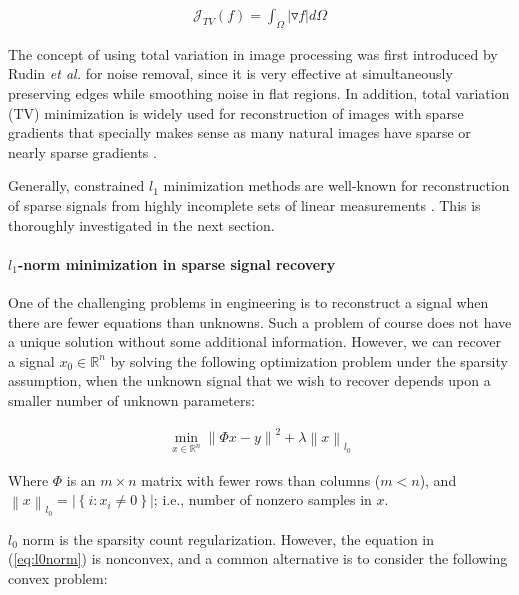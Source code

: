\begin{equation}
\begin{gathered}
\mathcal{J}_{TV}(f) = \int_{\Omega} |\triangledown f| d\Omega
\end{gathered}
\end{equation}

The concept of using total variation in image processing was first introduced by Rudin \emph{et al.} \cite{rudin1992nonlinear} for noise removal, since it is very effective at simultaneously preserving edges while smoothing noise in flat regions. In addition, total variation (TV) minimization is widely used for reconstruction of images with sparse gradients that specially makes sense as many natural images have sparse or nearly sparse gradients \cite{blomgren1998color}.

Generally, constrained $l_{1}$ minimization methods are well-known for reconstruction of sparse signals from highly incomplete sets of linear measurements \cite{candes2008enhancing}. This is thoroughly investigated in the next section.

\paragraph{$l_{1}$-norm minimization in sparse signal recovery}

One of the challenging problems in engineering is to reconstruct a signal when there are fewer equations than unknowns. Such a problem of course does not have a unique solution without some additional information. However, we can recover a signal $x_{0}\in \mathbb{R}^{n}$ by solving the following optimization problem under the sparsity assumption, when the unknown signal that we wish to recover depends upon a smaller number of unknown parameters:

\begin{equation}
\label{eq:l0norm}
\begin{gathered}
\min_{x\in \mathbb{R}^{n}}\left\|\Phi x-y\right\|^{2} + \lambda \left \|x  \right \|_{l_{0}}
\end{gathered}
\end{equation}

Where $\Phi$ is an $m \times n$ matrix with fewer rows than columns ($m<n$), and $\left \| x \right \|_{l_{0}}=\left | \left \{ i:x_{i} \neq 0 \right \} \right |$; i.e., number of nonzero samples in $x$.

$l_{0}$ norm is the sparsity count regularization. However, the equation in (\ref{eq:l0norm}) is nonconvex, and a common alternative is to consider the following convex problem:

